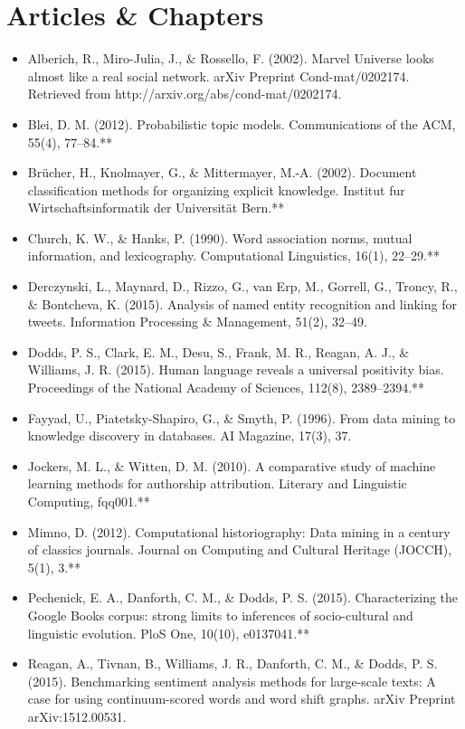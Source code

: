 \documentclass[12pt,a4paper]{article}
\begin{document}
\section*{Articles \& Chapters}	
\begin{itemize}
\item Alberich, R., Miro-Julia, J., \& Rossello, F. (2002). Marvel Universe looks almost like a real social network. arXiv Preprint Cond-mat/0202174. Retrieved from http://arxiv.org/abs/cond-mat/0202174.

\item Blei, D. M. (2012). Probabilistic topic models. Communications of the ACM, 55(4), 77–84.**
\item Brücher, H., Knolmayer, G., \& Mittermayer, M.-A. (2002). Document classification methods for organizing explicit knowledge. Institut fur Wirtschaftsinformatik der Universität Bern.**
\item Church, K. W., \& Hanks, P. (1990). Word association norms, mutual information, and lexicography. Computational Linguistics, 16(1), 22–29.**
\item Derczynski, L., Maynard, D., Rizzo, G., van Erp, M., Gorrell, G., Troncy, R., \& Bontcheva, K. (2015). Analysis of named entity recognition and linking for tweets. Information Processing \& Management, 51(2), 32–49.
\item Dodds, P. S., Clark, E. M., Desu, S., Frank, M. R., Reagan, A. J., \& Williams, J. R. (2015). Human language reveals a universal positivity bias. Proceedings of the National Academy of Sciences, 112(8), 2389–2394.**
\item Fayyad, U., Piatetsky-Shapiro, G., \& Smyth, P. (1996). From data mining to knowledge discovery in databases. AI Magazine, 17(3), 37.
\item Jockers, M. L., \& Witten, D. M. (2010). A comparative study of machine learning methods for authorship attribution. Literary and Linguistic Computing, fqq001.**
\item Mimno, D. (2012). Computational historiography: Data mining in a century of classics journals. Journal on Computing and Cultural Heritage (JOCCH), 5(1), 3.**
\item Pechenick, E. A., Danforth, C. M., \& Dodds, P. S. (2015). Characterizing the Google Books corpus: strong limits to inferences of socio-cultural and linguistic evolution. PloS One, 10(10), e0137041.**
\item Reagan, A., Tivnan, B., Williams, J. R., Danforth, C. M., & Dodds, P. S. (2015). Benchmarking sentiment analysis methods for large-scale texts: A case for using continuum-scored words and word shift graphs. arXiv Preprint arXiv:1512.00531.

\end{itemize}
\end{document}
